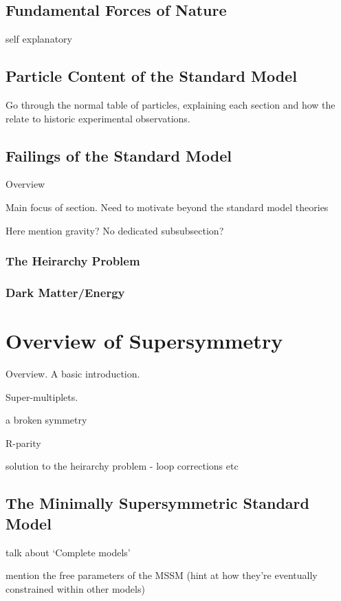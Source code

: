 \subsection{Fundamental Forces of Nature}
self explanatory

\subsection{Particle Content of the Standard Model}
Go through the normal table of particles, explaining each section and how the relate 
to historic experimental observations.

\subsection{Failings of the Standard Model}
Overview

Main focus of section. Need to motivate beyond the standard model theories

Here mention gravity? No dedicated subsubsection?

\subsubsection{The Heirarchy Problem}
\subsubsection{Dark Matter/Energy}


\section{Overview of Supersymmetry}  %
\label{sec:theory_overview}
Overview. A basic introduction.

Super-multiplets.

a broken symmetry

R-parity

solution to the heirarchy problem - loop corrections etc

\subsection{The Minimally Supersymmetric Standard Model}
talk about `Complete models'

mention the free parameters of the MSSM (hint at how they're eventually 
constrained within other models)

